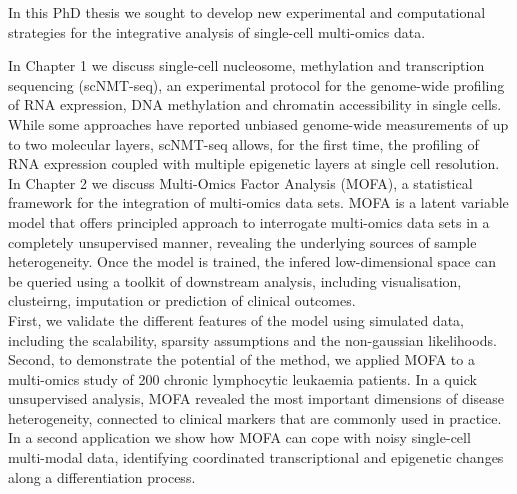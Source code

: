 In this PhD thesis we sought to develop new experimental and computational strategies for the integrative analysis of single-cell multi-omics data.

In Chapter 1 we discuss single-cell nucleosome, methylation and transcription sequencing (scNMT-seq), an experimental protocol for the genome-wide profiling of RNA expression, DNA methylation and chromatin accessibility in single cells. While some approaches have reported unbiased genome-wide measurements of up to two molecular layers, scNMT-seq allows, for the first time, the profiling of RNA expression coupled with multiple epigenetic layers at single cell resolution.\\

In Chapter 2 we discuss Multi-Omics Factor Analysis (MOFA), a statistical framework for the integration of multi-omics data sets. MOFA is a latent variable model that offers principled approach to interrogate multi-omics data sets in a completely unsupervised manner, revealing the underlying sources of sample heterogeneity. Once the model is trained, the infered low-dimensional space can be queried using a toolkit of downstream analysis, including visualisation, clusteirng, imputation or prediction of clinical outcomes.\\
First, we validate the different features of the model using simulated data, including the scalability, sparsity assumptions and the non-gaussian likelihoods. Second, to demonstrate the potential of the method, we applied MOFA to a multi-omics study of 200 chronic lymphocytic leukaemia patients. In a quick unsupervised analysis, MOFA revealed the most important dimensions of disease heterogeneity, connected to clinical markers that are commonly used in practice. In a second application we show how MOFA can cope with noisy single-cell multi-modal data, identifying coordinated transcriptional and epigenetic changes along a differentiation process.

